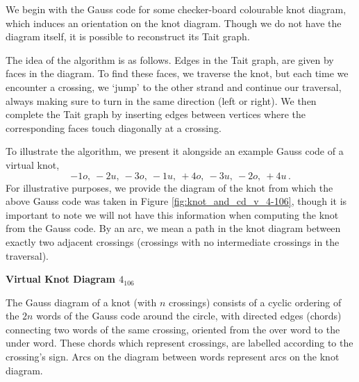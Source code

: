 \documentclass[12pt]{report}
\newcommand{\notered}[1]{{\color{Red} \textbf{#1}}}
\begin{document}
We begin with the Gauss code for some checker-board colourable knot diagram, which induces an orientation on the knot diagram. Though we do not have the diagram itself, it is possible to reconstruct its Tait graph.
	
	The idea of the algorithm is as follows. Edges in the Tait graph, are given by faces in the diagram. To find these faces, we traverse the knot, but each time we encounter a crossing, we `jump' to the other strand and continue our traversal, always making sure to turn in the same direction (left or right). We then complete the Tait graph by inserting edges between vertices where the corresponding faces touch diagonally at a crossing.
	
	To illustrate the algorithm, we present it alongside an example Gauss code of a virtual knot,
	\[-1o,\ -2u,\ -3o,\ -1u,\ +4o,\ -3u,\ -2o,\ +4u\,.\]
	For illustrative purposes, we provide the diagram of the knot from which the above Gauss code was taken in Figure \ref{fig:knot_and_cd_v_4-106}, though it is important to note we will not have this information when computing the knot from the Gauss code. By an arc, we mean a path in the knot diagram between exactly two adjacent crossings (crossings with no intermediate crossings in the traversal).
	
	\notered{Virtual Knot Diagram $4_{106}$}
		
	The Gauss diagram of a knot (with $n$ crossings) consists of a cyclic ordering of the $2n$ words of the Gauss code around the circle, with directed edges (chords) connecting two words of the same crossing, oriented from the over word to the under word. These chords which represent crossings, are labelled according to the crossing's sign. Arcs on the diagram between words represent arcs on the knot diagram.
	
\end{document}
